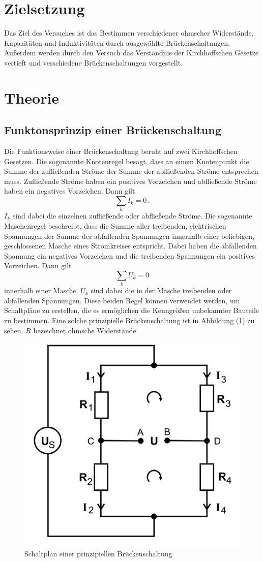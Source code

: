 \section{Zielsetzung}
\label{sec:Zielsetzung}
Das Ziel des Versuches ist das Bestimmen verschiedener ohmscher Widerstände, Kapazitäten und Induktivitäten durch ausgewählte Brückenschaltungen. Außerdem werden 
durch den Versuch das Verständnis der Kirchhoffschen Gesetze vertieft und verschiedene Brückenschaltungen vorgestellt.  

\section{Theorie}
\label{sec:Theorie}
    \subsection{Funktonsprinzip einer Brückenschaltung}
    Die Funktionsweise einer Brückenschaltung beruht auf zwei Kirchhoffschen Gesetzen. Die sogenannte Knotenregel besagt, dass an einem Knotenpunkt die Summe der 
    zufließenden Ströme der Summe der abfließenden Ströme entsprechen muss. Zufließende Ströme haben ein positives Vorzeichen und abfließende Ströme haben ein 
    negatives Vorzeichen. Dann gilt 
    \begin{equation}
        \label{eqn:Knotenregel}
        \sum_k {I_k} = 0 \,.
    \end{equation}
    $I_k$ sind dabei die einzelnen zufließende oder abfließende Ströme. 
    Die sogenannte Maschenregel beschreibt, dass die Summe aller treibenden, elektrischen Spannungen der Summe der abfallenden Spannungen innerhalb einer beliebigen, geschlossenen 
    Masche eines Stromkreises entspricht. Dabei haben die abfallenden Spannung ein negatives Vorzeichen und die treibenden Spannungen ein positives Vorzeichen. 
    Dann gilt
    \begin{equation}
        \label{eqn:Maschenregel}
        \sum_k {U_k} = 0 
    \end{equation}
    innerhalb einer Masche. $U_k$ sind dabei die in der Masche treibenden oder abfallenden Spannungen. 
    Diese beiden Regel können verwendet werden, um Schaltpläne zu erstellen, die es ermöglichen die Kenngrößen unbekannter Bauteile zu bestimmen. Eine 
    solche prinzipielle Brückenschaltung ist in Abbildung (\ref{pic:prinzipielle_Brückenschaltung}) zu sehen. $R$ bezeichnet ohmsche Widerstände.
    \begin{figure}[H]
        \centering
        \includegraphics[width=0.4\linewidth]{prinzipielle_Schaltung.png}
        \caption{Schaltplan einer prinzipiellen Brückenschaltung}
        \label{pic:prinzipielle_Brückenschaltung}
    \end{figure}
